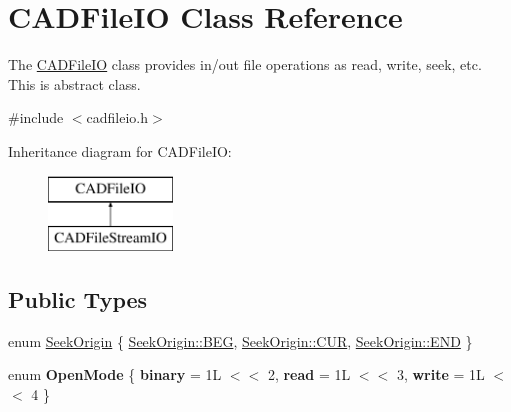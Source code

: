 \hypertarget{class_c_a_d_file_i_o}{}\section{C\+A\+D\+File\+IO Class Reference}
\label{class_c_a_d_file_i_o}


The \hyperlink{class_c_a_d_file_i_o}{C\+A\+D\+File\+IO} class provides in/out file operations as read, write, seek, etc. This is abstract class.  




{\ttfamily \#include $<$cadfileio.\+h$>$}

Inheritance diagram for C\+A\+D\+File\+IO\+:\begin{figure}[H]
\begin{center}
\leavevmode
\includegraphics[height=2.000000cm]{class_c_a_d_file_i_o}
\end{center}
\end{figure}
\subsection*{Public Types}
\begin{DoxyCompactItemize}
\item 
enum \hyperlink{class_c_a_d_file_i_o_ac02f709414ed2d228f8dfdabb4eb1b4f}{Seek\+Origin} \{ \hyperlink{class_c_a_d_file_i_o_ac02f709414ed2d228f8dfdabb4eb1b4facdf5cd8617366687b19657108513b589}{Seek\+Origin\+::\+B\+EG}, 
\hyperlink{class_c_a_d_file_i_o_ac02f709414ed2d228f8dfdabb4eb1b4faf32924c53f864144ab34d1f7c12a0d4a}{Seek\+Origin\+::\+C\+UR}, 
\hyperlink{class_c_a_d_file_i_o_ac02f709414ed2d228f8dfdabb4eb1b4fab1a326c06d88bf042f73d70f50197905}{Seek\+Origin\+::\+E\+ND}
 \}
\item 
enum {\bfseries Open\+Mode} \{ {\bfseries binary} = 1L $<$$<$ 2, 
{\bfseries read} = 1L $<$$<$ 3, 
{\bfseries write} = 1L $<$$<$ 4
 \}\hypertarget{class_c_a_d_file_i_o_a81582712e60f9c460ea0396901c4d424}{}\label{class_c_a_d_file_i_o_a81582712e60f9c460ea0396901c4d424}

\end{DoxyCompactItemize}
